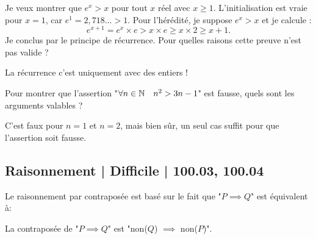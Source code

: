 \begin{question}
Je veux montrer que $e^x > x$ pour tout $x$ réel avec $x \ge 1$.
L'initialisation est vraie pour $x=1$, car $e^1 = 2,718\ldots >1$.
Pour l'hérédité, je suppose $e^x>x$ et je calcule :
$$e^{x+1} = e^x \times e > x  \times e \ge x \times 2 \ge x + 1.$$
Je conclus par le principe de récurrence.
Pour quelles raisons cette preuve n'est pas valide ?
\begin{answers}

    

\end{answers}
\begin{explanations}
La récurrence c'est uniquement avec des entiers !
\end{explanations}
\end{question}


\begin{question}
Pour montrer que l'assertion 
"$\forall n \in \mathbb{N} \quad n^2 > 3n-1$" est fausse,
quels sont les arguments valables ?
\begin{answers}

    
    
\end{answers}
\begin{explanations}
C'est faux pour $n=1$ et $n=2$, mais bien sûr, un seul cas suffit pour que l'assertion soit fausse. 
\end{explanations}
\end{question}





\subsection{Raisonnement | Difficile | 100.03, 100.04}


\begin{question}
Le raisonnement par contraposée est basé
sur le fait que "$P \implies Q$" est équivalent à:
\begin{answers}



\end{answers}
\begin{explanations}
La contraposée de "$P \implies Q$" est "non($Q$) $\implies$ non($P$)".
\end{explanations}
\end{question}


